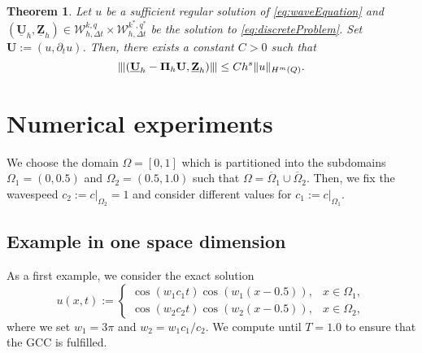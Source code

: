 \documentclass[10pt,reqno]{amsart}
\newtheorem{thm}{Theorem}[section]
\numberwithin{equation}{section}
\newcommand{\tnorm}[1]{\vert\hspace{-0.3mm}\Vert#1\Vert\hspace{-0.3mm}\vert}
\newcommand{\ProdFullyDiscrSpace}[2]{ \mathcal{W}^{ {#1},{#2}}_{h, \Delta t  } }
\newcommand{\Uh}{\underline{\mathbf{U}}_h}
\newcommand{\Zh}{\underline{\mathbf{Z}}_h}
\begin{document}
\begin{thm}
    Let $u$ be a sufficient regular solution of \eqref{eq:waveEquation} and $(\Uh,\Zh) \in \ProdFullyDiscrSpace{k}{q} \times \ProdFullyDiscrSpace{k^\ast}{q^\ast}$ be the solution to \eqref{eq:discreteProblem}. Set $\mathbf{U} := (u,\partial_t u)$. Then, there exists a constant $C>0$ such that
    \begin{equation}
        \tnorm{(\Uh - \mathbf{\Pi}_h \mathbf{U},\Zh)} \le C h^s \Vert u \Vert_{H^m(Q)}.
    \end{equation}
\end{thm}

\section{Numerical experiments}
\noindent We choose the domain $\Omega = [0,1]$ which is partitioned into the subdomains $\Omega_1 = (0,0.5)$ and $\Omega_2 = (0.5,1.0)$ such that $\Omega = \overline{\Omega}_1 \cup \overline{\Omega}_2$. Then, we fix the wavespeed $c_2 := c \vert_{\Omega_2} = 1$ and consider different values for $c_1 := c \vert_{\Omega_1}$.

\subsection{Example in one space dimension}
As a first example, we consider the exact solution
\begin{equation}\label{eq:1D:exact:simple}
    u(x,t) := \begin{cases}
        \cos(w_1 c_1 t) \cos(w_1(x-0.5)), & x \in \Omega_1, \\
        \cos(w_2 c_2 t) \cos(w_2(x-0.5)), & x \in \Omega_2,
    \end{cases}
\end{equation}
where we set $w_1 = 3 \pi$ and $w_2 = w_1 c_1 / c_2$. We compute until $T = 1.0$ to ensure that the GCC is fulfilled. 
\end{document}
